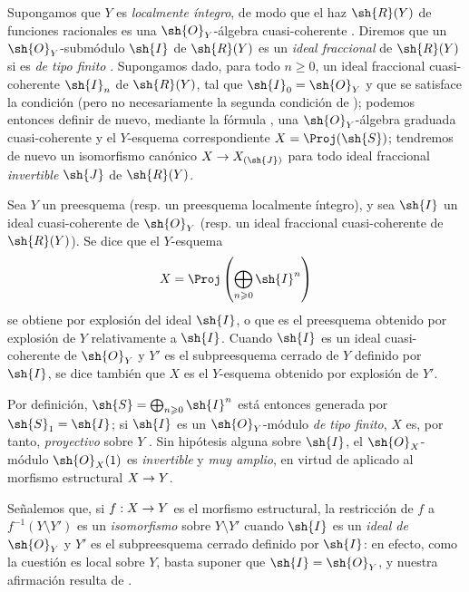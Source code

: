 \documentclass[oneside,10pt]{amsart}
\makeatletter
\renewcommand{\geq}{\geqslant}
\newcommand{\ega@arrow}[2]{\mathchoice{#1}{#2}{#2}{#2}}
\renewcommand{\to}{\ega@arrow{\longrightarrow}{\rightarrow}}
\let\EGAOriginalLabel\label
\renewcommand{\label}[1]{\phantomsection\EGAOriginalLabel{#1}}
\makeatother
\begin{document}
\begin{env}[8.1.2]
\label{II.8.1.2}
Supongamos que $Y$ es \emph{localmente íntegro}, de modo que el haz $\sh{R}(Y)$ de funciones racionales es una $\sh{O}_Y$-álgebra cuasi-coherente .
Diremos que un $\sh{O}_Y$-submódulo $\sh{I}$ de $\sh{R}(Y)$ es un \emph{ideal fraccional} de $\sh{R}(Y)$ si es \emph{de tipo finito} .
Supongamos dado, para todo $n\geq0$, un ideal fraccional cuasi-coherente $\sh{I}_n$ de $\sh{R}(Y)$, tal que $\sh{I}_0=\sh{O}_Y$ y que se satisface la condición  (pero no necesariamente la segunda condición de );
podemos entonces definir de nuevo, mediante la fórmula , una $\sh{O}_Y$-álgebra graduada cuasi-coherente y el $Y$-esquema correspondiente $X=\Proj(\sh{S})$;
tendremos de nuevo un isomorfismo canónico $X\to X_{(\sh{J})}$ para todo ideal fraccional \emph{invertible} $\sh{J}$ de $\sh{R}(Y)$.
\end{env}

\begin{definition}[8.1.3]
\label{II.8.1.3}
Sea $Y$ un preesquema \textup{(resp.} un preesquema localmente íntegro), y sea $\sh{I}$ un ideal cuasi-coherente de $\sh{O}_Y$ \textup{(resp.} un ideal fraccional cuasi-coherente de $\sh{R}(Y)$).
Se dice que el $Y$-esquema
\[
  X=\Proj\left(\bigoplus_{n\geq0}\sh{I}^n\right)
\]
se obtiene por explosión del ideal $\sh{I}$, o que es el preesquema obtenido por explosión de $Y$ relativamente a $\sh{I}$.
Cuando $\sh{I}$ es un ideal cuasi-coherente de $\sh{O}_Y$ y $Y'$ es el subpreesquema cerrado de $Y$ definido por $\sh{I}$, se dice también que $X$ es el $Y$-esquema obtenido por explosión de $Y'$.
\end{definition}

Por definición, $\sh{S}=\bigoplus_{n\geq0}\sh{I}^n$ está entonces generada por $\sh{S}_1=\sh{I}$;
si $\sh{I}$ es un $\sh{O}_Y$-módulo \emph{de tipo finito}, $X$ es, por tanto, \emph{proyectivo} sobre $Y$ .
Sin hipótesis alguna sobre $\sh{I}$, el $\sh{O}_X$-módulo $\sh{O}_X(1)$ es \emph{invertible}  y \emph{muy amplio}, en virtud de  aplicado al morfismo estructural $X\to Y$.

Señalemos que, si $f:X\to Y$ es el morfismo estructural, la restricción de $f$ a $f^{-1}(Y\setminus Y')$ es un \emph{isomorfismo} sobre $Y\setminus Y'$ cuando $\sh{I}$ es un \emph{ideal de $\sh{O}_Y$} y $Y'$ es el subpreesquema cerrado definido por $\sh{I}$:
en efecto, como la cuestión es local sobre $Y$, basta suponer que $\sh{I}=\sh{O}_Y$, y nuestra afirmación resulta de .
\end{document}
